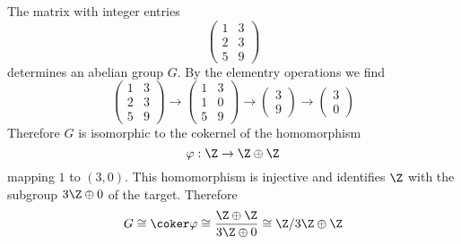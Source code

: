 \begin{example}
The matrix with integer entries
\[\begin{pmatrix}
1&3\\
2&3\\
5&9
\end{pmatrix}\]
determines an abelian group $G$. By the elementry operations we find
\[\begin{pmatrix}
1&3\\
2&3\\
5&9
\end{pmatrix}\longrightarrow\begin{pmatrix}
1&3\\
1&0\\
5&9
\end{pmatrix}\longrightarrow\begin{pmatrix}
3\\
9
\end{pmatrix}\longrightarrow\begin{pmatrix}
3\\
0
\end{pmatrix}\]
Therefore $G$ is isomorphic to the cokernel of the homomorphism
\[\varphi:\Z\to\Z\oplus\Z\]
mapping $1$ to $(3,0)$. This homomorphism is injective and identifies $\Z$ with the subgroup $3\Z\oplus0$ of the target. Therefore
\[G\cong\coker\varphi\cong\dfrac{\Z\oplus\Z}{3\Z\oplus 0}\cong\Z/3\Z\oplus\Z\]
\end{example}
